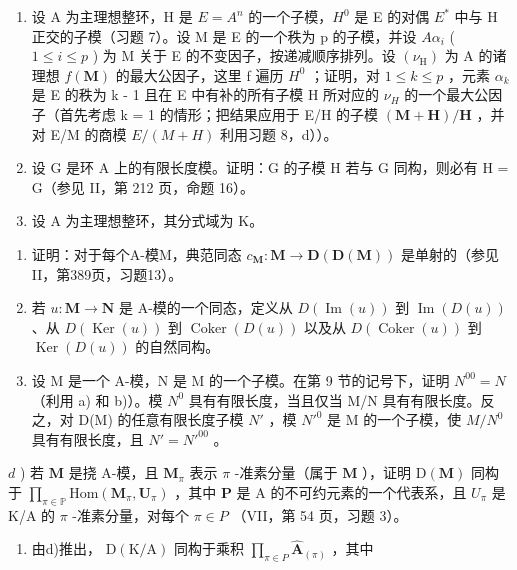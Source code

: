 \begin{enumerate}
\def\labelenumi{\arabic{enumi})}
\setcounter{enumi}{10}
\item
  设 A 为主理想整环，H 是 \(E = A^{n}\) 的一个子模，\(H^{0}\) 是 E 的对偶 \(E^{*}\) 中与 H 正交的子模（习题 7）。设 M 是 E 的一个秩为 p 的子模，并设 \(A\alpha_{i}\) ( \(1 \leqslant i \leqslant p\) ) 为 M 关于 E 的不变因子，按递减顺序排列。设 \((\nu_{\mathrm{H}})\) 为 A 的诸理想 \(f(\mathbf{M})\) 的最大公因子，这里 f 遍历 \(H^{0}\) ；证明，对 \(1 \leqslant k \leqslant p\) ，元素 \(\alpha_{k}\) 是 E 的秩为 k - 1 且在 E 中有补的所有子模 H 所对应的 \(\nu_{H}\) 的一个最大公因子（首先考虑 k = 1 的情形；把结果应用于 E/H 的子模 \((\mathbf{M} + \mathbf{H})/\mathbf{H}\) ，并对 E/M 的商模 \(E/(M + H)\) 利用习题 8，d））。
\item
  设 G 是环 A 上的有限长度模。证明：G 的子模 H 若与 G 同构，则必有 H = G（参见 II，第 212 页，命题 16）。
\item
  设 A 为主理想整环，其分式域为 K。
\end{enumerate}

\begin{enumerate}
\def\labelenumi{\alph{enumi})}
\item
  证明：对于每个A-模M，典范同态 \(c_{\mathbf{M}}: \mathbf{M} \to \mathbf{D}(\mathbf{D}(\mathbf{M}))\) 是单射的（参见II，第389页，习题13）。
\item
  若 \(u: \mathbf{M} \to \mathbf{N}\) 是 A-模的一个同态，定义从 \(D(\operatorname{Im}(u))\) 到 \(\operatorname{Im}(D(u))\) 、从 \(D(\operatorname{Ker}(u))\) 到 \(\operatorname{Coker}(D(u))\) 以及从 \(D(\operatorname{Coker}(u))\) 到 \(\operatorname{Ker}(D(u))\) 的自然同构。
\item
  设 M 是一个 A-模，N 是 M 的一个子模。在第 9 节的记号下，证明 \(N^{00} = N\) （利用 a) 和 b)）。模 \(N^{0}\) 具有有限长度，当且仅当 M/N 具有有限长度。反之，对 D(M) 的任意有限长度子模 \(N'\) ，模 \(N'^{0}\) 是 M 的一个子模，使 \(M/N^{0}\) 具有有限长度，且 \(N' = N'^{00}\) 。
\end{enumerate}

\(d\) ) 若 \(\mathbf{M}\) 是挠 A-模，且 \(\mathbf{M}_{\pi}\) 表示 \(\pi\) -准素分量（属于 \(\mathbf{M}\) ），证明 \(\mathrm{D}(\mathbf{M})\) 同构于 \(\prod_{\pi \in \mathbb{P}}\mathrm{Hom}(\mathbf{M}_{\pi},\mathbf{U}_{\pi})\) ，其中 \(\mathbf{P}\) 是 A 的不可约元素的一个代表系，且 \(U_{\pi}\) 是 K/A 的 \(\pi\) -准素分量，对每个 \(\pi \in P\) （VII，第 54 页，习题 3）。

\begin{enumerate}
\def\labelenumi{\alph{enumi})}
\setcounter{enumi}{4}
\tightlist
\item
  由d)推出， \(\mathrm{D}(\mathrm{K}/\mathrm{A})\) 同构于乘积 \(\prod_{\pi\in P}\hat{\mathbf{A}}_{(\pi)}\) ，其中
\end{enumerate}

